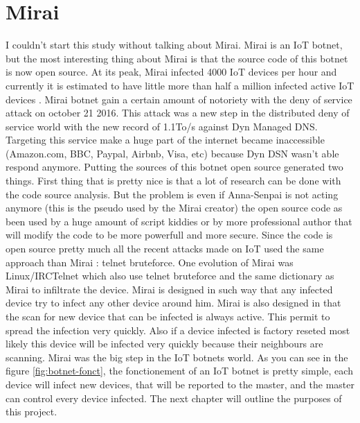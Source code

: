 \documentclass{report}
\begin{document}
\section{Mirai}
I couldn't start this study without talking about Mirai. Mirai is an IoT botnet, but the most interesting thing about Mirai is that the source code of this botnet is now open source. At its peak, Mirai infected 4000 IoT devices
per hour and currently it is estimated to have little more than half a million infected active IoT devices \autocite{angrishi2017turning}. Mirai botnet gain a certain amount of notoriety with the deny of service attack on october 21 2016. This attack was a new step in the distributed deny of service world with the new record of 1.1To/s against Dyn Managed DNS. Targeting this service make a huge part of the internet became inaccessible (Amazon.com, BBC, Paypal, Airbnb, Visa, etc) because Dyn DSN wasn't able respond anymore.\newline
Putting the sources of this botnet open source generated two things. First thing that is pretty nice is that a lot of research can be done with the code source analysis. But the problem is even if Anna-Senpai is not acting anymore (this is the pseudo used by the Mirai creator) the open source code as been used by a huge amount of script kiddies or by more professional author that will modify the code to be more powerfull and more secure. Since the code is open source pretty much all the recent attacks made on IoT used the same approach than Mirai : telnet bruteforce.
One evolution of Mirai was Linux/IRCTelnet which also use telnet bruteforce and the same dictionary as Mirai to infiltrate the device.\newline
\newline
Mirai is designed in such way that any infected device try to infect any other device around him. Mirai is also designed in that the scan for new device that can be infected is always active. This permit to spread the infection very quickly. Also if a device infected is factory reseted most likely this device will be infected very quickly because their neighbours are scanning. Mirai was the big step in the IoT botnets world.\newline
\newline
As you can see in the figure \ref{fig:botnet-fonct}, the fonctionement of an IoT botnet is pretty simple, each device will infect new devices, that will be reported to the master, and the master can control every device infected.\newline
The next chapter will outline the purposes of this project.
\end{document}
